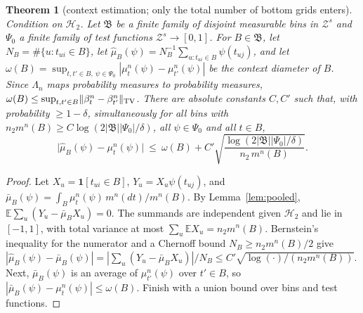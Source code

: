 \documentclass[11pt]{article}
\newtheorem{theorem}{Theorem}
\theoremstyle{definition}
\newcommand{\E}{\mathbb{E}}
\newcommand{\norm}[1]{\lVert #1\rVert}
\newcommand{\cH}{\mathcal H}
\begin{document}
\begin{theorem}[context estimation; only the total number of bottom grids enters]\label{thm:depthg}
Condition on $\cH_2$. Let $\mathfrak B$ be a finite family of disjoint measurable bins in
$\mathcal Z^s$ and $\Psi_0$ a finite family of test functions $\mathcal Z^s\to[0,1]$. For
$B\in\mathfrak B$, let $N_B=\#\{u:t_{ui}\in B\}$, let
$\hat\mu_B(\psi)=N_B^{-1}\sum_{u:t_{ui}\in B}\psi(t_{uj})$, and let
$\omega(B)=\sup_{t,t'\in B,\ \psi\in\Psi_0}|\mu^n_t(\psi)-\mu^n_{t'}(\psi)|$ be the context diameter
of $B$. Since $\Lambda_n$ maps probability measures to probability measures,
$\omega(B)\le\sup_{t,t'\in B}\norm{\beta^n_t-\beta^n_{t'}}_{\rm TV}$.
There are absolute constants $C,C'$ such that, with probability $\ge1-\delta$, simultaneously
for all bins with $n_2m^n(B)\ge C\log(2|\mathfrak B||\Psi_0|/\delta)$, all $\psi\in\Psi_0$ and
all $t\in B$,
\[
\big|\hat\mu_B(\psi)-\mu^n_t(\psi)\big|\ \le\ \omega(B)+C'\sqrt{\frac{\log(2|\mathfrak B||\Psi_0|/\delta)}{n_2\,m^n(B)}} .
\]
\end{theorem}
\begin{proof}
Let $X_u=\mathbf 1[t_{ui}\in B]$, $Y_u=X_u\psi(t_{uj})$, and
$\bar\mu_B(\psi)=\int_B\mu^n_t(\psi)\,m^n(dt)/m^n(B)$. By Lemma~\ref{lem:pooled},
$\E\sum_u(Y_u-\bar\mu_BX_u)=0$. The summands are independent given $\cH_2$ and lie in $[-1,1]$, with
total variance at most $\sum_u\E X_u=n_2m^n(B)$. Bernstein's inequality for the numerator and a
Chernoff bound $N_B\ge n_2m^n(B)/2$ give
$|\hat\mu_B(\psi)-\bar\mu_B(\psi)|=|\sum_u(Y_u-\bar\mu_BX_u)|/N_B\le C'\sqrt{\log(\cdot)/(n_2m^n(B))}$.
Next, $\bar\mu_B(\psi)$ is an average of $\mu^n_{t'}(\psi)$ over $t'\in B$, so
$|\bar\mu_B(\psi)-\mu^n_t(\psi)|\le\omega(B)$.
Finish with a union bound over bins and test functions.
\end{proof}
\end{document}
